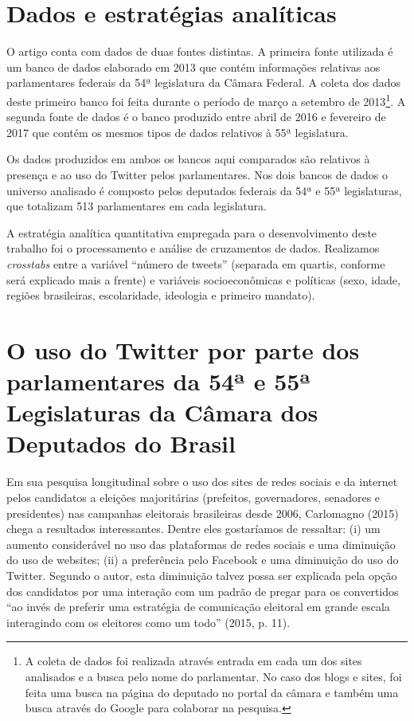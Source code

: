\section{Dados e estratégias analíticas}

O artigo conta com dados de duas fontes distintas. A primeira fonte
utilizada é um banco de dados elaborado em 2013 que contém informações
relativas aos parlamentares federais da 54ª legislatura da Câmara
Federal. A coleta dos dados deste primeiro banco foi feita durante o
período de março a setembro de 2013\footnote{A coleta de dados foi
  realizada através entrada em cada um dos sites analisados e a busca
  pelo nome do parlamentar. No caso dos blogs e sites, foi feita uma
  busca na página do deputado no portal da câmara e também uma busca
  através do Google para colaborar na pesquisa.}. A segunda fonte de
dados é o banco produzido entre abril de 2016 e fevereiro de 2017 que
contém os mesmos tipos de dados relativos à 55ª legislatura.

Os dados produzidos em ambos os bancos aqui comparados são relativos à
presença e ao uso do Twitter pelos parlamentares. Nos dois bancos de
dados o universo analisado é composto pelos deputados federais da 54ª e
55ª legislaturas, que totalizam 513 parlamentares em cada legislatura.

A estratégia analítica quantitativa empregada para o desenvolvimento
deste trabalho foi o processamento e análise de cruzamentos de dados.
Realizamos \emph{crosstabs} entre a variável ``número de tweets''
(separada em quartis, conforme será explicado mais a frente) e variáveis
socioeconômicas e políticas (sexo, idade, regiões brasileiras,
escolaridade, ideologia e primeiro mandato).

\section{O uso do Twitter por parte dos parlamentares da 54ª e 55ª
Legislaturas da Câmara dos Deputados do Brasil}

Em sua pesquisa longitudinal sobre o uso dos sites de redes sociais e da
internet pelos candidatos a eleições majoritárias (prefeitos,
governadores, senadores e presidentes) nas campanhas eleitorais
brasileiras desde 2006, Carlomagno (2015) chega a resultados
interessantes. Dentre eles gostaríamos de ressaltar: (i) um aumento
considerável no uso das plataformas de redes sociais e uma diminuição do
uso de websites; (ii) a preferência pelo Facebook e uma diminuição do
uso do Twitter. Segundo o autor, esta diminuição talvez possa ser
explicada pela opção dos candidatos por uma interação com um padrão de
pregar para os convertidos ``ao invés de preferir uma estratégia de
comunicação eleitoral em grande escala interagindo com os eleitores como
um todo'' (2015, p. 11).

